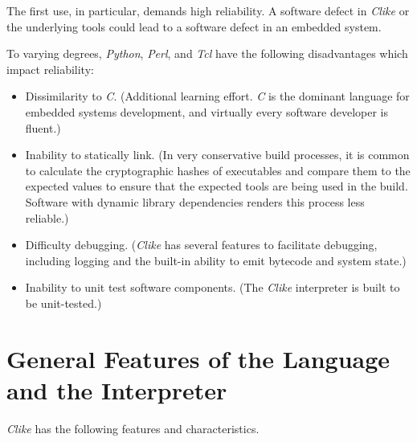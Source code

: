 The first use, in particular, demands high reliability.  A software defect
in \emph{Clike} or the underlying tools could lead to a software defect
in an embedded system.

To varying degrees, 
\emph{Python},
\emph{Perl}, and
\emph{Tcl} have the 
following disadvantages which impact reliability:

\begin{itemize}
   \item Dissimilarity to \emph{C}.  (Additional learning effort.
         \emph{C} is the dominant language for embedded systems
         development, and virtually every software developer is fluent.)
   \item Inability to statically link.  (In very conservative build processes,
         it is common to calculate the cryptographic hashes of executables and
         compare them to the expected values to ensure that the expected tools are
         being used in the build.  Software with dynamic library dependencies
         renders this process less reliable.)
   \item Difficulty debugging.  (\emph{Clike} has several features to facilitate
         debugging, including logging and the built-in ability to emit bytecode and
         system state.)
   \item Inability to unit test software components.  (The \emph{Clike} interpreter
         is built to be unit-tested.)
\end{itemize}

\section{General Features of the Language and the Interpreter}
\label{ccik2:sgft0}

\emph{Clike} has the following features and characteristics.

